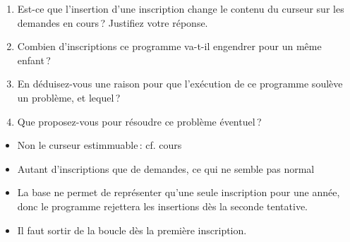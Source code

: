 \begin{enumerate}
  \item Est-ce que l'insertion d'une inscription change le contenu du curseur sur les demandes
      en cours\,?  Justifiez votre réponse.
  \item Combien d'inscriptions ce programme va-t-il engendrer pour un même enfant\,? 
   \item En déduisez-vous une raison pour que l'exécution de ce programme soulève
      un problème, et lequel\,?
      \item Que proposez-vous pour résoudre ce problème éventuel\,?
\end{enumerate}


\begin{solution}
\begin{itemize}
  \item Non le curseur estimmuable\,: cf. cours
  \item Autant d'inscriptions que de demandes, ce qui ne semble pas normal
  \item La base ne permet de représenter qu'une seule inscription
      pour une année, donc le programme rejettera les insertions 
      dès la seconde tentative.
   \item Il faut sortir de  la boucle dès la première inscription.
\end{itemize}
\end{solution}




